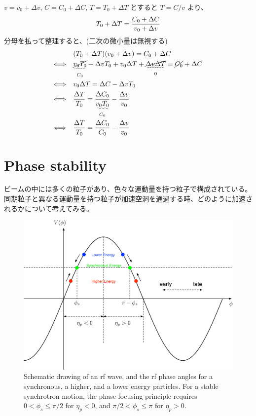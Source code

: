 \documentclass[10pt,a4paper]{ltjsarticle}
\begin{document}
\begin{tcolorbox}[title=式 (\ref{delta_T}) の導出]
    $v = v_0 + \Delta v$, $C=C_0 + \Delta C$, $T = T_0 + \Delta T$ とすると $T = C/v$ より、
    \begin{equation}
        T_0 + \Delta T = \frac{C_0 + \Delta C}{v_0 + \Delta v} \notag
    \end{equation}
    分母を払って整理すると、(二次の微小量は無視する)
    \begin{align}
        & (T_0 + \Delta T)(v_0 + \Delta v) = C_0 + \Delta C \notag \\
        \Longleftrightarrow\quad & \underset{C_0}{\uwave{\cancel{v_0 T_0}}} + \Delta v T_0 + v_0 \Delta T +
        \underset{0}{\uwave{\cancel{\Delta v \Delta T}}}
        = \cancel{C_0} + \Delta C \notag \\
        \Longleftrightarrow\quad & v_0 \Delta T = \Delta C- \Delta v T_0 \notag \\
        \Longleftrightarrow\quad & \frac{\Delta T}{T_0} = \frac{\Delta C_0}{\underset{C_0}{\uwave{v_0 T_0}}} - \frac{\Delta v}{v_0} \notag \\
        \Longleftrightarrow\quad & \frac{\Delta T}{T_0} = \frac{\Delta C_0}{C_0} - \frac{\Delta v}{v_0} \notag
    \end{align}
\end{tcolorbox}


\section{Phase stability}
ビームの中には多くの粒子があり、色々な運動量を持つ粒子で構成されている。同期粒子と異なる運動量を持つ粒子が加速空洞を通過する時、どのように加速されるかについて考えてみる。
%
\begin{figure}[hbt]
    \begin{center}
      \includegraphics[width=15cm,clip]{phase_stability.pdf}
      \caption{Schematic drawing of an rf wave, and the rf phase angles for a synchronous, a higher, and a lower energy particles.
      For a stable synchrotron motion, the phase focusing principle requires $0 < \phi_s \leq \pi/2$ for $\eta_p < 0$,
      and $\pi/2 < \phi_s \leq \pi$ for $\eta_p > 0$.}
      \label{phase_stability}
    \end{center}
\end{figure}
\end{document}
